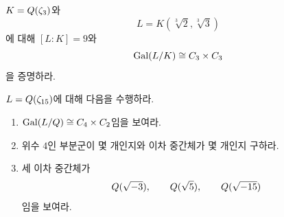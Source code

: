 \begin{exercise}
$K=Q(\zeta_3)$와
\[
  L=K(\sqrt[3]{2},\sqrt[3]{3})
\]
에 대해 $[L:K]=9$와
\[
  \operatorname{Gal}(L/K)\cong C_3\times C_3
\]
을 증명하라.
\end{exercise}

\begin{exercise}[*]
$L=Q(\zeta_{15})$에 대해 다음을 수행하라.
\begin{enumerate}[label=(\alph*)]
  \item $\operatorname{Gal}(L/Q)\cong C_4\times C_2$임을 보여라.
  \item 위수 $4$인 부분군이 몇 개인지와 이차 중간체가 몇 개인지 구하라.
  \item 세 이차 중간체가
  \[
    Q(\sqrt{-3}),\qquad
    Q(\sqrt5),\qquad
    Q(\sqrt{-15})
  \]
  임을 보여라.
\end{enumerate}
\end{exercise}
